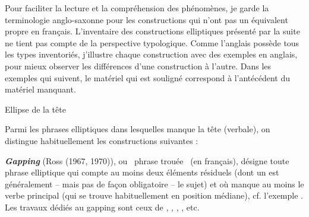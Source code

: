 Pour faciliter la lecture et la compréhension des phénomènes, je garde la terminologie anglo-saxonne pour les constructions qui n'ont pas un équivalent propre en français. L'inventaire des constructions elliptiques présenté par la suite ne tient pas compte de la perspective typologique. Comme l'anglais possède tous les types inventoriés, j'illustre chaque construction avec des exemples en anglais, pour mieux observer les différences d'une construction à l'autre. Dans les exemples qui suivent, le matériel qui est souligné correspond à l'antécédent du matériel manquant.

Ellipse de la tête

Parmi les phrases elliptiques dans lesquelles manque la tête (verbale), on distingue habituellement les constructions suivantes :

\textbf{\textit{Gapping} }(Ross (1967, 1970)), ou {\guillemotleft}~phrase trouée~{\guillemotright} (en français), désigne toute phrase elliptique qui compte au moins deux éléments résiduels (dont un est généralement -- mais pas de façon obligatoire -- le sujet)  et où manque au moins le verbe principal (qui se trouve habituellement en position médiane), cf. l'exemple . Les travaux dédiés au gapping sont ceux de \citet{Neijt1979}, \citet{Gardent1991}, \citet{Hartmann2000}, \citet{Repp2009}, etc.


